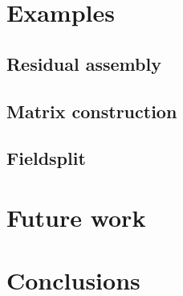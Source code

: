 \documentclass[thesis]{subfiles}
\begin{document}

  \section{Examples}

  \subsection{Residual assembly}

  \subsection{Matrix construction}

  \subsection{Fieldsplit}



  \section{Future work}


  \section{Conclusions}
\end{document}
